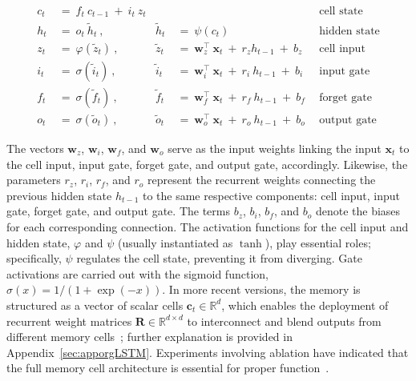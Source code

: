 \begin{align}
c_t \ &= \  f_t \ c_{t-1} \ + \ i_t \ z_t &  & &\text{cell state} \\
h_t  \ &= \ o_t \ \tilde{h}_t \ , & \tilde{h}_t \ &= \ \psi \left( c_t\right)
  &\text{hidden state} \\
z_t \ &= \ \varphi \left( \tilde{z}_t \right) \ , 
  &\tilde{z}_t \ &=  \ \mathbf{w}^\top_{z} \ \mathbf{x}_t \ + \
  r_{z}  h_{t-1} \ + \  b_{z} \ \
  &\text{cell input} \\
i_t \ &= \ \sigma \left( \tilde{i}_t  \right) \ , 
  &\tilde{i}_t \ &= \ \mathbf{w}^\top_{i} \ \mathbf{x}_t \ + \
  r_{i}  \ h_{t-1} \ + \  b_{i} \ \
  &\text{input gate} \\
f_t \ &= \ \sigma \left(  \tilde{f}_t \right) \ , 
  &\tilde{f}_t \ &= \ \mathbf{w}^\top_{f} \ \mathbf{x}_t  \ + \
  r_{f}  \ h_{t-1} \ + \  b_{f} \ \
  &\text{forget gate} \\
o_t \ &= \ \sigma \left( \tilde{o}_t \right) \ , 
  &\tilde{o}_t  \ &= \ \mathbf{w}^\top_{o} \ \mathbf{x}_t \ + \
  r_{o}  \ h_{t-1} \ + \  b_{o} \ \
  &\text{output gate} 
\end{align}

The vectors $\mathbf{w}_{z}$, $\mathbf{w}_{i}$, $\mathbf{w}_{f}$, and $\mathbf{w}_{o}$ serve as the input weights linking the input $\mathbf{x}_t$ to the cell input, input gate, forget gate, and output gate, accordingly. Likewise, the parameters $r_{z}$, $r_{i}$, $r_{f}$, and $r_{o}$ represent the recurrent weights connecting the previous hidden state $h_{t-1}$ to the same respective components: cell input, input gate, forget gate, and output gate. The terms $b_{z}$, $b_{i}$, $b_{f}$, and $b_{o}$ denote the biases for each corresponding connection. The activation functions for the cell input and hidden state, $\varphi$ and $\psi$ (usually instantiated as $\tanh$), play essential roles; specifically, $\psi$ regulates the cell state, preventing it from diverging. Gate activations are carried out with the sigmoid function, $\sigma \left( x \right)= 1/(1+\exp(-x))$. In more recent versions, the memory is structured as a vector of scalar cells $\mathbf{c}_t \in \mathbb{R}^{d}$, which enables the deployment of recurrent weight matrices $\mathbf{R} \in \mathbb{R}^{d \times d}$ to interconnect and blend outputs from different memory cells~\citep{Greff:15}; further explanation is provided in Appendix~\ref{sec:apporgLSTM}. Experiments involving ablation have indicated that the full memory cell architecture is essential for proper function~\citep{Greff:15}.

